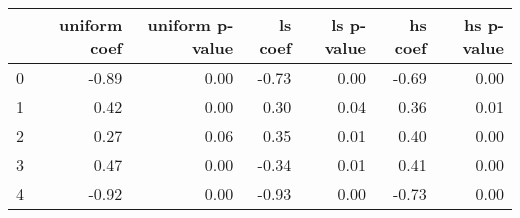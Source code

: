\begin{tabular}{lrrrrrr}
\toprule
 & uniform coef & uniform p-value & ls coef & ls p-value & hs coef & hs p-value \\
\midrule
0 & -0.89 & 0.00 & -0.73 & 0.00 & -0.69 & 0.00 \\
1 & 0.42 & 0.00 & 0.30 & 0.04 & 0.36 & 0.01 \\
2 & 0.27 & 0.06 & 0.35 & 0.01 & 0.40 & 0.00 \\
3 & 0.47 & 0.00 & -0.34 & 0.01 & 0.41 & 0.00 \\
4 & -0.92 & 0.00 & -0.93 & 0.00 & -0.73 & 0.00 \\
\bottomrule
\end{tabular}
